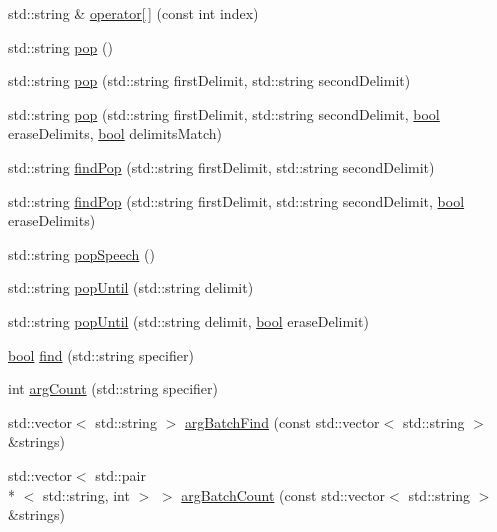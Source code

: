 \begin{DoxyCompactItemize}
\item 
std\-::string \& \hyperlink{classStringstack_a53a36a2da20ea60f2c9df67506f3748b}{operator\mbox{[}$\,$\mbox{]}} (const int index)
\item 
std\-::string \hyperlink{classStringstack_a8a9777f29361b6e493108a234f89b81d}{pop} ()
\item 
std\-::string \hyperlink{classStringstack_a991eff1393a30e44e8b327501c10c417}{pop} (std\-::string first\-Delimit, std\-::string second\-Delimit)
\item 
std\-::string \hyperlink{classStringstack_afa99c109a0b5c1632a6402780dbcc97d}{pop} (std\-::string first\-Delimit, std\-::string second\-Delimit, \hyperlink{structs_8h_ad5c9d4ba3dc37783a528b0925dc981a0}{bool} erase\-Delimits, \hyperlink{structs_8h_ad5c9d4ba3dc37783a528b0925dc981a0}{bool} delimits\-Match)
\item 
std\-::string \hyperlink{classStringstack_a71b03b6b0c5d15074abde46944d71864}{find\-Pop} (std\-::string first\-Delimit, std\-::string second\-Delimit)
\item 
std\-::string \hyperlink{classStringstack_ad378b6dd8a9d55605d3c17b452fd5dda}{find\-Pop} (std\-::string first\-Delimit, std\-::string second\-Delimit, \hyperlink{structs_8h_ad5c9d4ba3dc37783a528b0925dc981a0}{bool} erase\-Delimits)
\item 
std\-::string \hyperlink{classStringstack_ab1db05c3fe40c98493b6e02134eb8d64}{pop\-Speech} ()
\item 
std\-::string \hyperlink{classStringstack_afd03c9d391bfd931ffb35e544230b402}{pop\-Until} (std\-::string delimit)
\item 
std\-::string \hyperlink{classStringstack_aaad2f5dc1df9ef88da1c2e2fc676f5dd}{pop\-Until} (std\-::string delimit, \hyperlink{structs_8h_ad5c9d4ba3dc37783a528b0925dc981a0}{bool} erase\-Delimit)
\item 
\hyperlink{structs_8h_ad5c9d4ba3dc37783a528b0925dc981a0}{bool} \hyperlink{classStringstack_ab657ed4278c068f32715c8b0b4d03312}{find} (std\-::string specifier)
\item 
int \hyperlink{classStringstack_ab3b7b4445b0ea898feaea34657e00c92}{arg\-Count} (std\-::string specifier)
\item 
std\-::vector$<$ std\-::string $>$ \hyperlink{classStringstack_a6e9d7a9a8909e5699f935575bf15fb5c}{arg\-Batch\-Find} (const std\-::vector$<$ std\-::string $>$ \&strings)
\item 
std\-::vector$<$ std\-::pair\\*
$<$ std\-::string, int $>$ $>$ \hyperlink{classStringstack_a807cfc6a9e73c3614e1ccec547721092}{arg\-Batch\-Count} (const std\-::vector$<$ std\-::string $>$ \&strings)

\end{DoxyCompactItemize}
